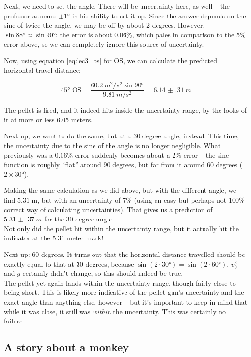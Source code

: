 \documentclass[12pt,a4paper]{report}
\begin{document}
Next, we need to set the angle. There will be uncertainty here, as well -- the professor assumes $\pm \ang{1}$ in his ability to set it up. Since the answer depends on the sine of twice the angle, we may be off by about 2 degrees. However, $\sin{\ang{88}} \approx \sin{\ang{90}}$: the error is about 0.06\%, which pales in comparison to the 5\% error above, so we can completely ignore this source of uncertainty.

Now, using equation \eqref{eq:lec3_os} for OS, we can calculate the predicted horizontal travel distance:

\begin{equation}
\ang{45}\text{ OS} = \frac{\SI{60.2}{m^2/s^2} \sin \ang{90}}{\SI{9.81}{m/s^2}} = \SI{6.14(31)}{m}
\end{equation}

The pellet is fired, and it indeed hits inside the uncertainty range, by the looks of it at more or less 6.05 meters.

Next up, we want to do the same, but at a 30 degree angle, instead. This time, the uncertainty due to the sine of the angle is no longer negligible. What previously was a 0.06\% error suddenly becomes about a 2\% error -- the sine function is roughly ``flat'' around 90 degrees, but far from it around 60 degrees ($2 \times \ang{30}$).

Making the same calculation as we did above, but with the different angle, we find $5.31$ m, but with an uncertainty of 7\% (using an easy  but perhaps not 100\% correct way of calculating uncertainties). That gives us a prediction of $\SI{5.31(37)}{m}$ for the 30 degree angle.\\
Not only did the pellet hit within the uncertainty range, but it actually hit the indicator at the 5.31 meter mark!

Next up: 60 degrees. It turns out that the horizontal distance travelled should be exactly equal to that at 30 degrees, because $\sin({2\cdot\ang{30}}) = \sin({2\cdot\ang{60}})$. $v_0^2$ and $g$ certainly didn't change, so this should indeed be true.\\
The pellet yet again lands within the uncertainty range, though fairly close to being short. This is likely more indicative of the pellet gun's uncertainty and the exact angle than anything else, however -- but it's important to keep in mind that while it was close, it still was \emph{within} the uncertainty. This was certainly no failure.

\subsection{A story about a monkey}
\end{document}

